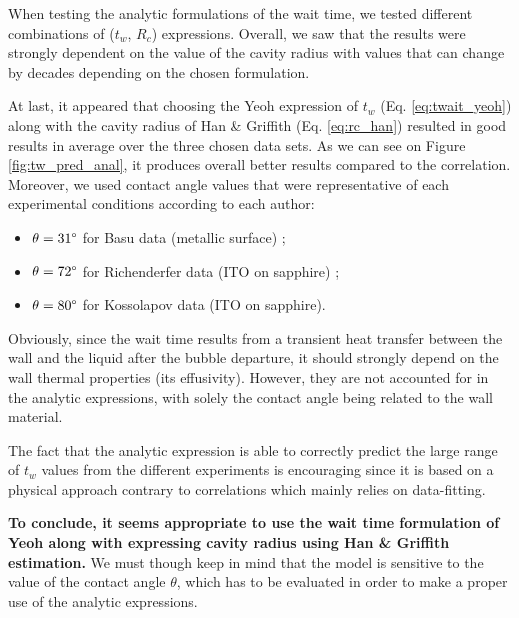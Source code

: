 \npar
When testing the analytic formulations of the wait time, we tested different combinations of ($t_{w}$, $R_{c}$) expressions. Overall, we saw that the results were strongly dependent on the value of the cavity radius with values that can change by decades depending on the chosen formulation.

\npar
At last, it appeared that choosing the Yeoh \etal expression of $t_{w}$ (Eq. \ref{eq:twait_yeoh}) along with the cavity radius of Han \& Griffith (Eq. \ref{eq:rc_han}) resulted in good results in average over the three chosen data sets. As we can see on Figure \ref{fig:tw_pred_anal}, it produces overall better results compared to the correlation. Moreover, we used contact angle values that were representative of each experimental conditions according to each author:

\begin{itemize}
\item $\theta = 31 \degree$ for Basu \etal data \cite{basu_wall_2005-1} (metallic surface) ;
\item $\theta = 72 \degree$ for Richenderfer data \cite{richenderfer_experimental_2018} (ITO on sapphire) ;
\item $\theta = 80 \degree$ for Kossolapov data \cite{kossolapov_experimental_2021} (ITO on sapphire).
\end{itemize} 

\begin{remark*}{}
Obviously, since the wait time results from a transient heat transfer between the wall and the liquid after the bubble departure, it should strongly depend on the wall thermal properties (\eg its effusivity). However, they are not accounted for in the analytic expressions, with solely the contact angle being related to the wall material. 
\end{remark*}

The fact that the analytic expression is able to correctly predict the large range of $t_{w}$ values from the different experiments is encouraging since it is based on a physical approach contrary to correlations which mainly relies on data-fitting.

\npar
\textbf{To conclude, it seems appropriate to use the wait time formulation of Yeoh \etal along with expressing cavity radius using Han \& Griffith estimation.} We must though keep in mind that the model is sensitive to the value of the contact angle $\theta$, which has to be evaluated in order to make a proper use of the analytic expressions.


